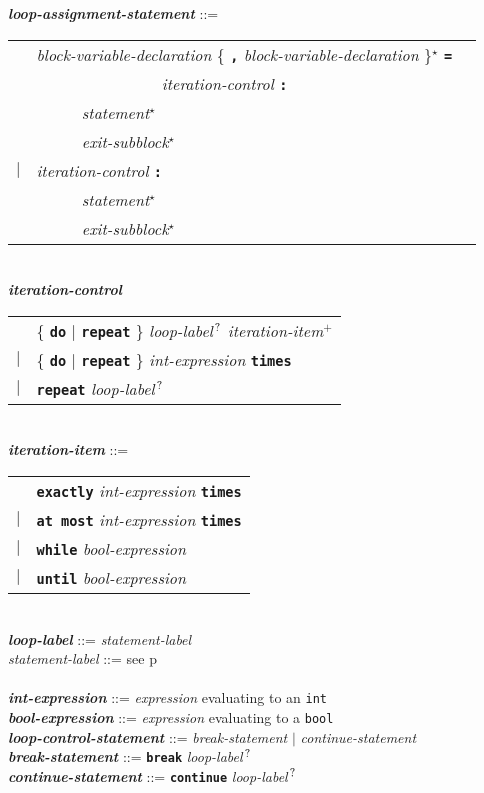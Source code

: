 \documentclass[12pt]{article}
\newcommand{\TT}[1]{{\tt \bfseries #1}}
\newcommand{\STAR}{{\Large $^\star$}}
\newcommand{\PLUS}[1][]{{$^{+#1}$}}
\newcommand{\QMARK}{{$^{\,\mbox{\footnotesize ?}}$}}
\newcommand{\ttkey}[1]{{\tt \bfseries #1}}
\newcommand{\emkey}[1]{{\em \bfseries #1}}
\newcommand{\pagref}[1]{p\pageref{#1}}
\newenvironment{indpar}[1][0.3in]%
	{\begin{list}{}%
		     {\setlength{\itemsep}{0in}%
		      \setlength{\topsep}{0in}%
		      \setlength{\parsep}{1ex}%
		      \setlength{\labelwidth}{#1}%
		      \setlength{\leftmargin}{#1}%
		      \addtolength{\leftmargin}{\labelsep}}%
	 \item}%
	{\end{list}}
\begin{document}
\begin{indpar}
\emkey{loop-assignment-statement} ::= \\
\hspace*{0.5in}
    \begin{tabular}[t]{@{}rll}
        & {\em block-variable-declaration}
                \{ \TT{,} {\em block-variable-declaration} \}\STAR{}
		\TT{=} \\
	& ~~~~~~~~~~~~~~~ {\em iteration-control} \TT{:} \\
        & ~~~~~ {\em statement}\STAR{} \\
        & ~~~~~ {\em exit-subblock}\STAR{} \\
    $|$ & {\em iteration-control} \TT{:} \\
        & ~~~~~ {\em statement}\STAR{} \\
        & ~~~~~ {\em exit-subblock}\STAR{} \\
    \end{tabular}
\\[0.5ex]
\emkey{iteration-control}\label{ITERATION-CONTROL}
    \begin{tabular}[t]{rl}
         & \{ \ttkey{do} $|$ \ttkey{repeat} \} {\em loop-label}\QMARK{}
           {\em iteration-item}\PLUS{} \\
     $|$ & \{ \ttkey{do} $|$ \ttkey{repeat} \}
           {\em int-expression} \ttkey{times } \\
     $|$ & \ttkey{repeat} {\em loop-label}\QMARK{}
     \end{tabular}
\\[0.5ex]
\emkey{iteration-item}\label{ITERATION-ITEM} ::=
    \begin{tabular}[t]{rl}
         & \ttkey{exactly} {\em int-expression} \ttkey{times} \\
     $|$ & \ttkey{at most} {\em int-expression} \ttkey{times} \\
     $|$ & \ttkey{while} {\em bool-expression} \\
     $|$ & \ttkey{until} {\em bool-expression} \\
     \end{tabular}
\\[0.5ex]
\emkey{loop-label} ::= {\em statement-label}
\\[0.5ex]
{\em statement-label} ::= see \pagref{STATEMENT-LABEL} \\
\\[0.5ex]
\emkey{int-expression} ::= {\em expression} evaluating to an {\tt int}
\\[0.5ex]
\emkey{bool-expression}\label{BOOL-EXPRESSION} ::=
    {\em expression} evaluating to a {\tt bool}
\\[0.5ex]
\emkey{loop-control-statement}\label{LOOP-CONTROL-STATEMENT} ::=
    {\em break-statement} $|$ {\em continue-statement}
\\[0.5ex]
\emkey{break-statement}\label{BREAK-STATEMENT} ::=
    \ttkey{break} {\em loop-label}\QMARK{}
\\[0.5ex]
\emkey{continue-statement}\label{CONTINUE-STATEMENT} ::=
    \ttkey{continue} {\em loop-label}\QMARK{}
\end{indpar}
\end{document}
